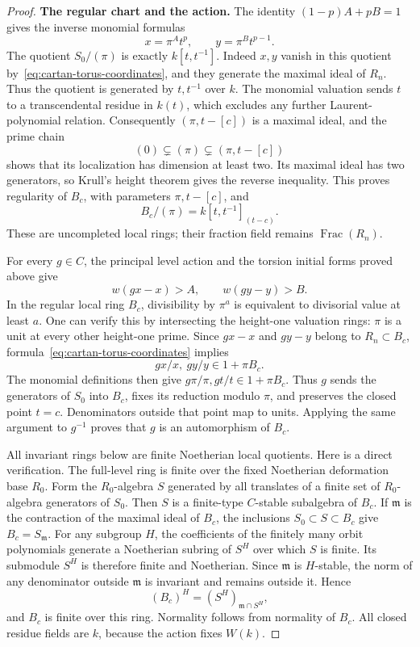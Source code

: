 \begin{proof}
\par\medskip\noindent\textbf{The regular chart and the action.}\enspace
The identity $(1-p)A+pB=1$ gives the inverse monomial formulas
\begin{equation}\label{eq:cartan-torus-coordinates}
 x=\pi^A t^p,\qquad y=\pi^B t^{p-1}.
\end{equation}
The quotient $S_0/(\pi)$ is exactly $k[t,t^{-1}]$. Indeed $x,y$ vanish in this quotient by~\eqref{eq:cartan-torus-coordinates}, and they generate the maximal ideal of $R_n$. Thus the quotient is generated by $t,t^{-1}$ over $k$. The monomial valuation sends $t$ to a transcendental residue in $k(t)$, which excludes any further Laurent-polynomial relation. Consequently $(\pi,t-[c])$ is a maximal ideal, and the prime chain
\[
 (0)\subsetneq(\pi)\subsetneq(\pi,t-[c])
\]
shows that its localization has dimension at least two. Its maximal ideal has two generators, so Krull's height theorem gives the reverse inequality. This proves regularity of $B_c$, with parameters $\pi,t-[c]$, and
\begin{equation}\label{eq:cartan-torus-original-divisor}
 B_c/(\pi)=k[t,t^{-1}]_{(t-c)}.
\end{equation}
These are uncompleted local rings; their fraction field remains $\operatorname{Frac}(R_n)$.

For every $g\in C$, the principal level action and the torsion initial forms proved above give
\[
 w(gx-x)>A,\qquad w(gy-y)>B.
\]
In the regular local ring $B_c$, divisibility by $\pi^a$ is equivalent to divisorial value at least $a$. One can verify this by intersecting the height-one valuation rings: $\pi$ is a unit at every other height-one prime. Since $gx-x$ and $gy-y$ belong to $R_n\subset B_c$, formula~\eqref{eq:cartan-torus-coordinates} implies
\[
 gx/x,\ gy/y\in1+\pi B_c.
\]
The monomial definitions then give $g\pi/\pi,gt/t\in1+\pi B_c$. Thus $g$ sends the generators of $S_0$ into $B_c$, fixes its reduction modulo $\pi$, and preserves the closed point $t=c$. Denominators outside that point map to units. Applying the same argument to $g^{-1}$ proves that $g$ is an automorphism of $B_c$.

All invariant rings below are finite Noetherian local quotients. Here is a direct verification. The full-level ring is finite over the fixed Noetherian deformation base $R_0$. Form the $R_0$-algebra $S$ generated by all translates of a finite set of $R_0$-algebra generators of $S_0$. Then $S$ is a finite-type $C$-stable subalgebra of $B_c$. If $\mathfrak m$ is the contraction of the maximal ideal of $B_c$, the inclusions $S_0\subset S\subset B_c$ give $B_c=S_{\mathfrak m}$. For any subgroup $H$, the coefficients of the finitely many orbit polynomials generate a Noetherian subring of $S^H$ over which $S$ is finite. Its submodule $S^H$ is therefore finite and Noetherian. Since $\mathfrak m$ is $H$-stable, the norm of any denominator outside $\mathfrak m$ is invariant and remains outside it. Hence
\[
 (B_c)^H=(S^H)_{\mathfrak m\cap S^H},
\]
and $B_c$ is finite over this ring. Normality follows from normality of $B_c$. All closed residue fields are $k$, because the action fixes $W(k)$.


\end{proof}
